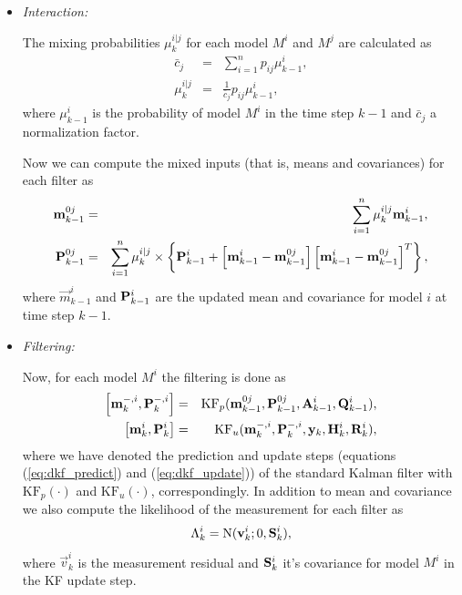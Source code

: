 \begin{itemize}

\item {\em Interaction:}
  
  The mixing probabilities $\mu_k^{i|j}$ for each model $M^i$ and
$M^j$ are calculated as
  \begin{eqnarray}
  \bar{c}_j & = & \sum_{i=1}^n p_{ij} \mu_{k-1}^i,\\ \label{eq:imm_cj}
\mu_k^{i|j} & = & \frac{1}{\bar{c}_j} p_{ij} \mu_{k-1}^i,
  \end{eqnarray}
  where $\mu_{k-1}^i$ is the probability of model $M^i$ in the time
step $k-1$ and $\bar{c}_j$ a normalization factor.

  Now we can compute the mixed inputs (that is, means and covariances)
for each filter as
  \begin{eqnarray}
  \mathbf{m}_{k-1}^{0j} & = & \sum_{i=1}^n \mu_k^{i|j} \mathbf{m}_{k-1}^i,
\\
  \mathbf{P}_{k-1}^{0j} & = & \sum_{i=1}^n \mu_k^{i|j} \times \left\{
\mathbf{P}_{k-1}^i +
\left[\mathbf{m}_{k-1}^i-\mathbf{m}_{k-1}^{0j}\right]\left[\mathbf{m}_{k-1}^i-\mathbf{m}_{k-1}^{0j}\right]^T\right\},
  \end{eqnarray}
  where $\vec{m}_{k-1}^i$ and $\mathbf{P}_{k-1}^i$ are the updated mean
and covariance for model $i$ at time step $k-1$.

\item {\em Filtering:}

  Now, for each model $M^i$ the filtering is done as
  \begin{eqnarray}
  \left[\mathbf{m}_{k}^{-,i},\mathbf{P}_{k}^{-,i}\right] & = &
\text{KF}_p(\mathbf{m}_{k-1}^{0j},\mathbf{P}_{k-1}^{0j},\mathbf{A}_{k-1}^i,\mathbf{Q}_{k-1}^i)
, \\ \label{eq:imm_predict}
  \left[\mathbf{m}_{k}^{i},\mathbf{P}_{k}^{i}\right] & = &
\text{KF}_u(\mathbf{m}_{k}^{-,i},\mathbf{P}_{k}^{-,i},\mathbf{y}_{k},\mathbf{H}_{k}^i,\mathbf{R}_{k}^i),
\label{eq:imm_update}
  \end{eqnarray}
  where we have denoted the prediction and update steps (equations
(\ref{eq:dkf_predict}) and (\ref{eq:dkf_update})) of the standard
Kalman filter with $\text{KF}_p(\cdot)$ and $\text{KF}_u(\cdot)$,
correspondingly. In addition to mean and covariance we also compute
the likelihood of the measurement for each filter as
  \begin{equation}
  \Lambda_k^i = \text{N}(\mathbf{v}_k^i;0,\mathbf{S}_k^i),
  \end{equation}
  where $\vec{v}_k^i$ is the measurement residual and $\mathbf{S}_k^i$
it's covariance for model $M^i$ in the KF update step.


\end{itemize}
